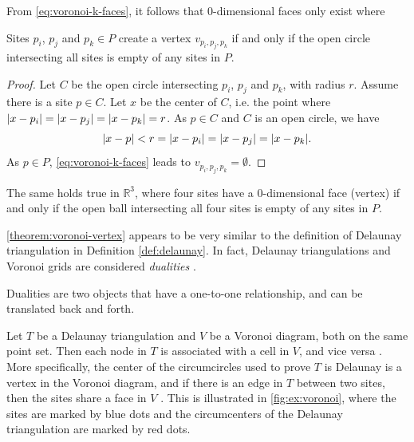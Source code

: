 From \autoref{eq:voronoi-k-faces}, it follows that 0-dimensional faces only exist where 
\begin{theorem}
\label{theorem:voronoi-vertex}
Sites $p_i$, $p_j$ and $p_k \in P$ create a vertex $v_{p_i, p_j, p_k}$ if and only if the open circle intersecting all sites is empty of any sites in $P$. 
\end{theorem}
\begin{proof}
Let $C$ be the open circle intersecting $p_i$, $p_j$ and $p_k$, with radius $r$. Assume there is a site $p \in C$. Let $x$ be the center of $C$, i.e. the point where $\lvert x - p_i\rvert = \lvert x - p_j\rvert = \lvert x - p_k\rvert = r$. As $p \in C$ and $C$ is an open circle, we have
\begin{equation*}
    \lvert x - p\rvert < r = \lvert x - p_i\rvert = \lvert x - p_j\rvert = \lvert x - p_k\rvert.
\end{equation*}
As $p \in P$, \autoref{eq:voronoi-k-faces} leads to $v_{p_i, p_j, p_k} = \emptyset$.
\end{proof}
The same holds true in $\mathbb{R}^3$, where four sites have a 0-dimensional face (vertex) if and only if the open ball intersecting all four sites is empty of any sites in $P$.

\autoref{theorem:voronoi-vertex} appears to be very similar to the definition of Delaunay triangulation in Definition \ref{def:delaunay}. In fact, Delaunay triangulations and Voronoi grids are considered \emph{dualities} \cite{UPR_chapter}.

\begin{definition}[Dualities]
Dualities are two objects that have a one-to-one relationship, and can be translated back and forth.
\end{definition}

Let $T$ be a Delaunay triangulation and $V$ be a Voronoi diagram, both on the same point set. Then each node in $T$ is associated with a cell in $V$, and vice versa \cite{UPR_chapter}. More specifically, the center of the circumcircles used to prove $T$ is Delaunay is a vertex in the Voronoi diagram, and if there is an edge in $T$ between two sites, then the sites share a face in $V$ \cite{UPR_chapter}. This is illustrated in \autoref{fig:ex:voronoi}, where the sites are marked by blue dots and the circumcenters of the Delaunay triangulation are marked by red dots.


